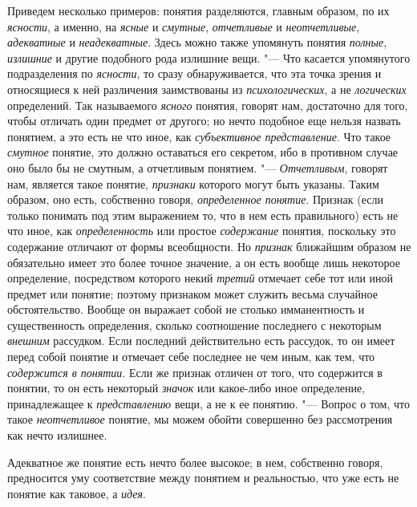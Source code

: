 Приведем несколько примеров: понятия разделяются, главным
образом, по их {\em ясности},
а именно, на {\em ясные}
и {\em смутные},
{\em отчетливые} и
{\em неотчетливые},
{\em адекватные} и
{\em неадекватные}. Здесь
можно также упомянуть понятия
{\em полные},
{\em излишние} и другие
подобного рода излишние вещи. "--- Что касается упомянутого
подразделения по {\em ясности},
то сразу обнаруживается, что эта точка зрения и относящиеся к
ней различения заимствованы из
{\em психологических}, а
не {\em логических}
определений. Так называемого
{\em ясного} понятия,
говорят нам, достаточно для того, чтобы отличать один предмет от другого;
но нечто подобное еще нельзя назвать понятием, а это есть не что иное, как
{\em субъективное представление}.
Что такое {\em смутное}
понятие, это должно оставаться его секретом, ибо в противном
случае оно было бы не смутным, а отчетливым понятием. "---
{\em Отчетливым}, говорят
нам, является такое понятие,
{\em признаки} которого
могут быть указаны. Таким образом, оно есть, собственно говоря,
{\em определенное понятие}.
Признак (если только понимать под этим выражением то, что в
нем есть правильного) есть не что иное, как
{\em определенность} или
простое {\em содержание}
понятия, поскольку это содержание отличают от формы
всеобщности. Но {\em признак}
ближайшим образом не обязательно имеет это более точное
значение, а он есть вообще лишь некоторое определение, посредством которого
некий {\em третий}
отмечает себе тот или иной предмет или понятие; поэтому
признаком может служить весьма случайное обстоятельство. Вообще он выражает
собой не столько имманентность и существенность определения, сколько
соотношение последнего с некоторым
{\em внешним} рассудком.
Если последний действительно есть рассудок, то он имеет перед собой понятие
и отмечает себе последнее не чем иным, как тем, что
{\em содержится в понятии}.
Если же признак отличен от того, что содержится в понятии, то
он есть некоторый {\em значок}
или какое-либо иное определение, принадлежащее к
{\em представлению} вещи,
а не к ее понятию. "--- Вопрос о том, что такое
{\em неотчетливое}
понятие, мы можем обойти совершенно без рассмотрения как
нечто излишнее.

Адекватное же понятие есть нечто более высокое; в нем,
собственно говоря, предносится уму соответствие между понятием и
реальностью, что уже есть не понятие как таковое, а
{\em идея}.

